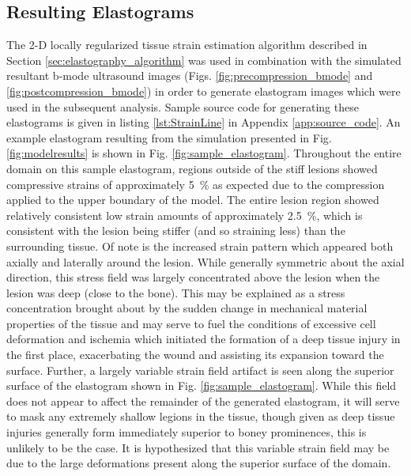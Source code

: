 		\subsection{Resulting Elastograms}
			\label{sec:elastogram}
			The 2-D locally regularized tissue strain estimation algorithm described in Section \ref{sec:elastography_algorithm} was used in combination with the simulated resultant b-mode ultrasound images (Figs. \ref{fig:precompression_bmode} and \ref{fig:postcompression_bmode}) in order to generate elastogram images which were used in the subsequent analysis. Sample source code for generating these elastograms is given in listing \ref{lst:StrainLine} in Appendix \ref{app:source_code}. An example elastogram resulting from the simulation presented in Fig. \ref{fig:modelresults} is shown in Fig. \ref{fig:sample_elastogram}. Throughout the entire domain on this sample elastogram, regions outside of the stiff lesions showed compressive strains of approximately \SI{5}{\percent} as expected due to the compression applied to the upper boundary of the model. The entire lesion region showed relatively consistent low strain amounts of approximately \SI{2.5}{\percent}, which is consistent with the lesion being stiffer (and so straining less) than the surrounding tissue. Of note is the increased strain pattern which appeared both axially and laterally around the lesion. While generally symmetric about the axial direction, this stress field was largely concentrated above the lesion when the lesion was deep (close to the bone). This may be explained as a stress concentration brought about by the sudden change in mechanical material properties of the tissue and may serve to fuel the conditions of excessive cell deformation and ischemia which initiated the formation of a deep tissue injury in the first place, exacerbating the wound and assisting its expansion toward the surface. Further, a largely variable strain field artifact is seen along the superior surface of the elastogram shown in Fig. \ref{fig:sample_elastogram}. While this field does not appear to affect the remainder of the generated elastogram, it will serve to mask any extremely shallow legions in the tissue, though given as deep tissue injuries generally form immediately superior to boney prominences, this is unlikely to be the case. It is hypothesized that this variable strain field may be due to the large deformations present along the superior surface of the domain.

